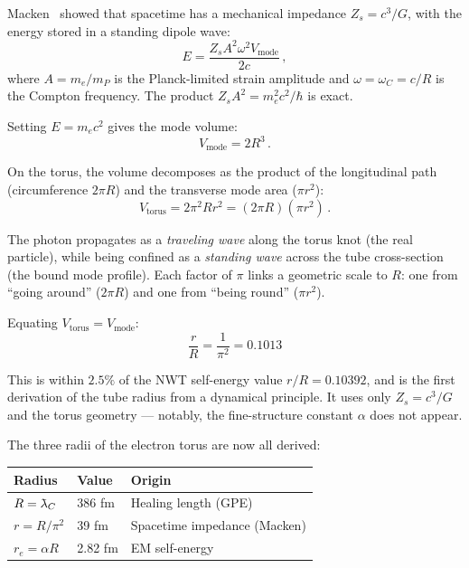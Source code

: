 \documentclass[11pt,a4paper]{article}
\newcommand{\lambdabar}{\mkern0.75mu\mathchar'26\mkern-9.75mu\lambda}
\begin{document}
Macken~\cite{macken} showed that spacetime has a mechanical impedance
$Z_s = c^3/G$, with the energy stored in a standing dipole wave:
\begin{equation}
  E = \frac{Z_s A^2 \omega^2 V_{\text{mode}}}{2c}\,,
  \label{eq:macken}
\end{equation}
where $A = m_e/m_P$ is the Planck-limited strain amplitude and
$\omega = \omega_C = c/R$ is the Compton frequency.  The product
$Z_s A^2 = m_e^2 c^2/\hbar$ is exact.

Setting $E = m_e c^2$ gives the mode volume:
\begin{equation}
  V_{\text{mode}} = 2R^3\,.
  \label{eq:vmode}
\end{equation}

On the torus, the volume decomposes as the product of the longitudinal
path (circumference $2\pi R$) and the transverse mode area ($\pi r^2$):
\begin{equation}
  V_{\text{torus}} = 2\pi^2 R r^2 = (2\pi R)(\pi r^2)\,.
  \label{eq:vtorus}
\end{equation}

The photon propagates as a \emph{traveling wave} along the torus knot
(the real particle), while being confined as a \emph{standing wave}
across the tube cross-section (the bound mode profile).  Each factor of
$\pi$ links a geometric scale to $R$: one from ``going around''
($2\pi R$) and one from ``being round'' ($\pi r^2$).

Equating $V_{\text{torus}} = V_{\text{mode}}$:
\begin{equation}
  \boxed{\frac{r}{R} = \frac{1}{\pi^2} = 0.1013}
  \label{eq:rR}
\end{equation}

This is within $2.5\%$ of the NWT self-energy value $r/R = 0.10392$,
and is the first derivation of the tube radius from a dynamical
principle.  It uses only $Z_s = c^3/G$ and the torus geometry ---
notably, the fine-structure constant $\alpha$ does not appear.

The three radii of the electron torus are now all derived:
\begin{center}
\begin{tabular}{lll}
\toprule
Radius & Value & Origin \\
\midrule
$R = \lambdabar_C$ & 386 fm & Healing length (GPE) \\
$r = R/\pi^2$ & 39 fm & Spacetime impedance (Macken) \\
$r_e = \alpha R$ & 2.82 fm & EM self-energy \\
\bottomrule
\end{tabular}
\end{center}
\end{document}
